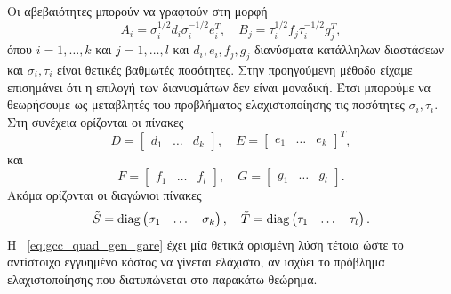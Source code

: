 Οι αβεβαιότητες μπορούν να γραφτούν στη μορφή
\[
    A_i = \sigma_i^{1/2}d_i\sigma_i^{-1/2}e_i^T, \quad
    B_j = \tau_i^{1/2}f_j\tau_i^{-1/2}g_j^T,
\]
όπου \( i = 1, \dots, k \) και \( j = 1, \dots, l \) και \(d_i, e_i, f_j, g_j \)
διανύσματα κατάλληλων διαστάσεων και \( \sigma_i, \tau_i \) είναι θετικές
βαθμωτές ποσότητες. Στην προηγούμενη μέθοδο είχαμε επισημάνει ότι η επιλογή των
διανυσμάτων δεν είναι μοναδική. Έτσι μπορούμε να θεωρήσουμε ως μεταβλητές του
προβλήματος ελαχιστοποίησης τις ποσότητες \( \sigma_i, \tau_i \). Στη συνέχεια
ορίζονται οι πίνακες
\[
    D = \begin{bmatrix} d_1 & \dots & d_k\end{bmatrix}, \quad
    E = \begin{bmatrix} e_1 & \dots & e_k\end{bmatrix}^T,
\]
και
\[
    F = \begin{bmatrix} f_1 & \dots & f_l\end{bmatrix}, \quad
    G = \begin{bmatrix} g_1 & \dots & g_l\end{bmatrix}.
\]
Ακόμα ορίζονται οι διαγώνιοι πίνακες
\[
    \tilde{S} = \operatorname{diag}\begin{pmatrix} \sigma_1 & \dots & \sigma_k\end{pmatrix}, \quad
    \tilde{T} = \operatorname{diag}\begin{pmatrix} \tau_1 & \dots & \tau_l\end{pmatrix}.
\]
Η ~\eqref{eq:gcc_quad_gen_gare} έχει μία θετικά ορισμένη λύση
τέτοια ώστε το αντίστοιχο εγγυημένο κόστος να γίνεται ελάχιστο, αν
ισχύει το πρόβλημα ελαχιστοποίησης που διατυπώνεται στο παρακάτω θεώρημα.


